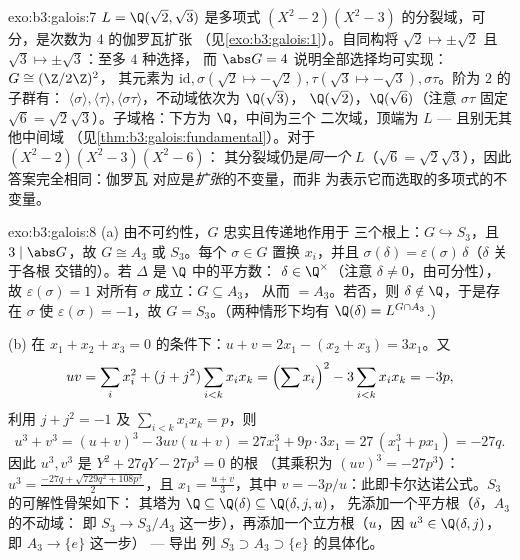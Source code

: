 \begin{solution}{exo:b3:galois:7}
$L = \Q(\sqrt2, \sqrt3)$ 是多项式 $(X^2 -
2)(X^2 - 3)$ 的分裂域，可分，是次数为 $4$ 的伽罗瓦扩张
（见\cref{exo:b3:galois:1}）。自同构将 $\sqrt2 \mapsto
\pm\sqrt2$ 且 $\sqrt3 \mapsto \pm\sqrt3$：至多 $4$ 种选择，
而 $\abs G = 4$ 说明全部选择均可实现：$G \cong (\Z/2\Z)^2$，
其元素为 $\mathrm{id}, \sigma (\sqrt2 \mapsto -\sqrt2), \tau
(\sqrt3\mapsto-\sqrt3), \sigma\tau$。阶为 $2$ 的子群有：
$\langle\sigma\rangle, \langle\tau\rangle,
\langle\sigma\tau\rangle$，不动域依次为 $\Q(\sqrt3)$，
$\Q(\sqrt2)$，$\Q(\sqrt6)$（注意 $\sigma\tau$ 固定 $\sqrt6 =
\sqrt2\sqrt3$）。子域格：下方为 $\Q$，中间为三个
二次域，顶端为 $L$ --- 且别无其他中间域
（见\cref{thm:b3:galois:fundamental}）。对于 $(X^2-2)(X^2-3)(X^2-6)$：
其分裂域仍是\emph{同一个} $L$（$\sqrt6 =
\sqrt2\sqrt3$），因此答案完全相同：伽罗瓦
对应是\emph{扩张}的不变量，而非
为表示它而选取的多项式的不变量。
\end{solution}

\begin{solution}{exo:b3:galois:8}
(a) 由不可约性，$G$ 忠实且传递地作用于
三个根上：$G \hookrightarrow S_3$，且 $3 \mid \abs G$，故 $G
\cong A_3$ 或 $S_3$。每个 $\sigma \in G$ 置换 $x_i$，并且
$\sigma(\delta) = \varepsilon(\sigma)\,\delta$（$\delta$ 关于各根
交错的）。若 $\Delta$ 是 $\Q$ 中的平方数：
$\delta \in \Q^\times$（注意 $\delta \neq 0$，由可分性），故
$\varepsilon(\sigma) = 1$ 对所有 $\sigma$ 成立：$G \subseteq A_3$，
从而 $= A_3$。若否，则 $\delta \notin \Q$，于是存在 $\sigma$ 使
$\varepsilon(\sigma) = -1$，故 $G = S_3$。（两种情形下均有 $\Q(\delta)
= L^{G \cap A_3}$.)

(b) 在 $x_1 + x_2 + x_3 = 0$ 的条件下：$u + v = 2x_1 - (x_2 + x_3) =
3x_1$。又
\[
uv = \sum_i x_i^2 + (j + j^2)\sum_{i<k}x_ix_k
= \Bigl(\sum x_i\Bigr)^2 - 3\sum_{i<k}x_ix_k = -3p,
\]
利用 $j + j^2 = -1$ 及 $\sum_{i<k}x_ix_k = p$，则
\[
u^3 + v^3 = (u+v)^3 - 3uv(u+v) = 27x_1^3 + 9p\cdot 3x_1
= 27\,(x_1^3 + px_1) = -27q .
\]
因此 $u^3, v^3$ 是 $Y^2 + 27qY - 27p^3 = 0$ 的根
（其乘积为 $(uv)^3 = -27p^3$）：$u^3 = \frac{-27q +
\sqrt{729q^2 + 108p^3}}2$，且 $x_1 = \frac{u + v}3$，其中 $v =
-3p/u$：此即卡尔达诺公式。$S_3$ 的可解性骨架如下：
其塔为 $\Q \subseteq \Q(\delta) \subseteq \Q(\delta, j, u)$，
先添加一个平方根（$\delta$，$A_3$ 的不动域：
即 $S_3 \to S_3/A_3$ 这一步），再添加一个立方根（$u$，因 $u^3
\in \Q(\delta, j)$，即 $A_3 \to \{e\}$ 这一步） --- 导出
列 $S_3 \supset A_3 \supset \{e\}$ 的具体化。
\end{solution}

